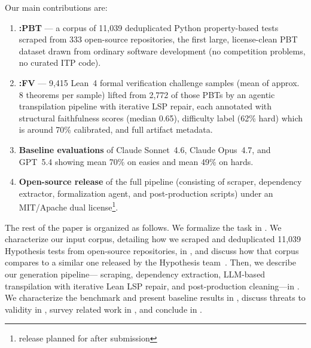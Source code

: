 Our main contributions are:
\begin{enumerate}
  \item \textbf{\FVSpec:PBT} — a corpus of 11{,}039 deduplicated Python property-based tests scraped from 333 open-source repositories, the first large, license-clean PBT dataset drawn from ordinary software development (no competition problems, no curated ITP code).
  \item \textbf{\FVSpec:FV} — 9{,}415 Lean~4 formal verification challenge samples (mean of approx. 8 theorems per sample) lifted from 2{,}772 of those PBTs by an agentic transpilation pipeline with iterative LSP repair, each annotated with structural faithfulness scores (median 0.65), difficulty label (62\% hard) which is around 70\% calibrated, and full artifact metadata.
  \item \textbf{Baseline evaluations} of Claude Sonnet~4.6, Claude Opus~4.7, and GPT~5.4 showing mean 70\% on easies and mean 49\% on hards.
  \item \textbf{Open-source release} of the full pipeline (consisting of scraper, dependency extractor, formalization agent, and post-production scripts) under an MIT/Apache dual license\footnote{release planned for after submission}.
\end{enumerate}

The rest of the paper is organized as follows.
We formalize the task in .
We characterize our input corpus, detailing how we scraped and deduplicated 11{,}039 Hypothesis tests from open-source repositories, in ,
and discuss how that corpus compares to a similar one released by the Hypothesis team~\cite{devoe2026hypothesis}.
Then, we describe our generation pipeline---
scraping,
dependency extraction, LLM-based transpilation with iterative Lean LSP repair, and post-production cleaning---in .
We characterize the benchmark and present baseline results in , discuss threats to validity in , survey related work in , and conclude in .
